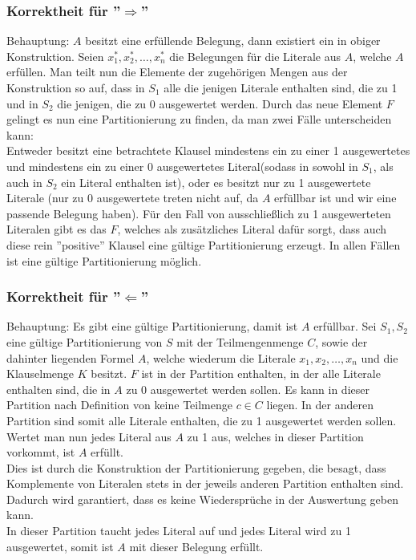 \documentclass[a4paper]{article}
\begin{document}
			\subsubsection{Korrektheit für ''$\Rightarrow$''}
			Behauptung: $A$ besitzt eine erfüllende Belegung, dann existiert ein \setsplit in obiger Konstruktion.\n
			Seien $x_1^*, x_2^*, \dots, x_n^*$ die Belegungen für die Literale aus $A$, welche $A$ erfüllen.
			Man teilt nun die Elemente der zugehörigen Mengen aus der Konstruktion so auf, dass in $S_1$ alle die jenigen Literale enthalten sind, die zu 1 und in $S_2$ die jenigen, die zu 0 ausgewertet werden.
			Durch das neue Element $F$ gelingt es nun eine Partitionierung zu finden, da man zwei Fälle unterscheiden kann:\\
			Entweder besitzt eine betrachtete Klausel mindestens ein zu einer 1 ausgewertetes und mindestens ein zu einer 0 ausgewertetes Literal(sodass in sowohl in $S_1$, als auch in $S_2$ ein Literal enthalten ist), oder es besitzt nur zu 1 ausgewertete Literale (nur zu 0 ausgewertete treten nicht auf, da $A$ erfüllbar ist und wir eine passende Belegung haben).
			Für den Fall von ausschließlich zu 1 ausgewerteten Literalen gibt es das $F$, welches als zusätzliches Literal dafür sorgt, dass auch diese rein ''positive'' Klausel eine gültige Partitionierung erzeugt.\n
			In allen Fällen ist eine gültige Partitionierung möglich.
			\subsubsection{Korrektheit für ''$\Leftarrow$''}
			Behauptung: Es gibt eine gültige Partitionierung, damit ist $A$ erfüllbar.\n
			Sei $S_1, S_2$ eine gültige Partitionierung von $S$ mit der Teilmengenmenge $C$, sowie der dahinter liegenden Formel $A$, welche wiederum die Literale $x_1, x_2, \dots, x_n$ und die Klauselmenge $K$ besitzt.
			$F$ ist in der Partition enthalten, in der alle Literale enthalten sind, die in $A$ zu 0 ausgewertet werden sollen. Es kann in dieser Partition nach Definition von \setsplit keine Teilmenge $c\in C$ liegen.
			In der anderen Partition sind somit alle Literale enthalten, die zu 1 ausgewertet werden sollen. Wertet man nun jedes Literal aus $A$ zu 1 aus, welches in dieser Partition vorkommt, ist $A$ erfüllt.\\
			Dies ist durch die Konstruktion der Partitionierung gegeben, die besagt, dass Komplemente von Literalen stets in der jeweils anderen Partition enthalten sind.
			Dadurch wird garantiert, dass es keine Wiedersprüche in der Auswertung geben kann.\\
			In dieser Partition taucht jedes Literal auf und jedes Literal wird zu 1 ausgewertet, somit ist $A$ mit dieser Belegung erfüllt.
		\subsection{}
\end{document}
